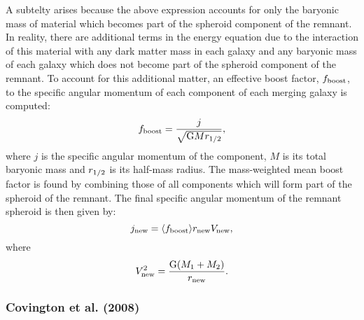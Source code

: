 A subtelty arises because the above expression accounts for only the baryonic mass of material which becomes part of the spheroid \gls{component} of the remnant. In reality, there are additional terms in the energy equation due to the interaction of this material with any dark matter mass in each galaxy and any baryonic mass of each galaxy which does not become part of the spheroid \gls{component} of the remnant. To account for this additional matter, an effective boost factor, $f_{\rm boost}$, to the specific angular momentum of each \gls{component} of each merging galaxy is computed:
\begin{equation}
 f_{\rm boost} = {j \over \sqrt{{\rm G} M r_{1/2}}},
\end{equation}
where $j$ is the specific angular momentum of the component, $M$ is its total baryonic mass and $r_{\rm 1/2}$ is its half-mass radius. The mass-weighted mean boost factor is found by combining those of all components which will form part of the spheroid of the remnant. The final specific angular momentum of the remnant spheroid is then given by:
\begin{equation}
 j_{\rm new} = \langle f_{\rm boost} \rangle r_{\rm new} V_{\rm new},
\end{equation}
where
\begin{equation}
 V_{\rm new}^2 = {{\rm G} (M_1+M_2)\over r_{\rm new}}.
\end{equation}

\subsubsection{Covington et al. (2008)}

